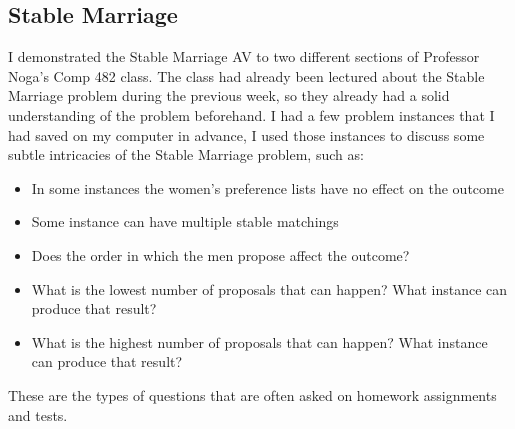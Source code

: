 \subsection{Stable Marriage}
\hspace{-0.26in}
I demonstrated the Stable Marriage AV to two different sections of Professor Noga's 
Comp 482 class. 
The class had already been lectured about the Stable Marriage problem during the previous week, 
so they already had a solid understanding of the problem beforehand. 
I had a few problem instances that I had saved on my computer in advance, 
I used those instances to discuss some subtle intricacies of the Stable Marriage problem, 
such as:
\begin{itemize}
	\item In some instances the women's preference lists have no effect on the outcome
	\item Some instance can have multiple stable matchings
	\item Does the order in which the men propose affect the outcome?
	\item What is the lowest number of proposals that can happen? What instance can produce that result?
	\item What is the highest number of proposals that can happen? What instance can produce that result?
\end{itemize} 
These are the types of questions that are often asked on homework assignments and tests. 